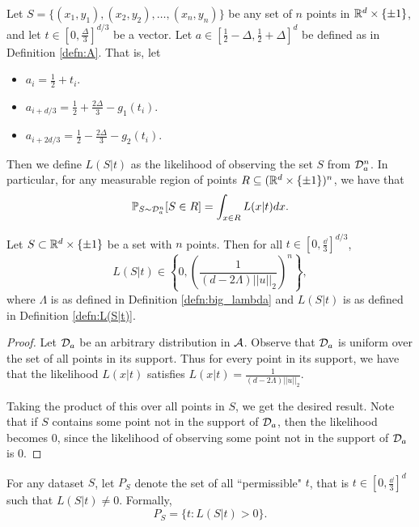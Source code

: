 \begin{defn}\label{defn:L(S|t)}
Let $S = \{(x_1, y_1), (x_2, y_2), \dots, (x_n, y_n)\}$ be any set of $n$ points in $\mathbb R^d \times \{\pm 1\}$, and let $t \in [0, \frac{\Delta}{3}]^{d/3}$ be a vector. Let $a \in [\frac{1}{2} - \Delta, \frac{1}{2} + \Delta]^d$ be defined as in Definition \ref{defn:A}. That is, let 
\begin{itemize}
	\item $a_i = \frac{1}{2} + t_i$.
	\item $a_{i + d/3} = \frac{1}{2} + \frac{2\Delta}{3} - g_1(t_i)$.
	\item $a_{i + 2d/3} = \frac{1}{2} - \frac{2\Delta}{3} - g_2(t_i)$. 
\end{itemize}
Then we define $L(S|t)$ as the likelihood of observing the set $S$ from ${\mathcal D}_a^n$. In particular, for any measurable region of points $R \subseteq (\mathbb R^d \times \{\pm 1\})^n$, we have that $$\mathbb{P}_{S \sim {\mathcal D}_a^n}[S \in R] = \int_{x \in R}L(x|t)dx.$$
\end{defn}

\begin{lem}\label{lem:binary}
Let $S \subset \mathbb R^d \times \{\pm 1\}$ be a set with $n$ points. Then for all $t \in [0, \frac{\dd}{3}]^{d/3}$, $$L(S|t) \in \left\{0, \left(\frac{1}{(d - 2\Lambda)||u||_2}\right)^n\right\},$$ where $\Lambda$ is as defined in Definition \ref{defn:big_lambda} and $L(S|t)$ is as defined in Definition \ref{defn:L(S|t)}. 
\end{lem}

\begin{proof}
Let ${\mathcal D}_a$ be an arbitrary distribution in $\mathcal{A}$. Observe that ${\mathcal D}_a$ is uniform over the set of all points in its support. Thus for every point in its support, we have that the likelihood $L(x|t)$ satisfies $L(x|t) = \frac{1}{(d - 2\Lambda)||u||_2}$. 

Taking the product of this over all points in $S$, we get the desired result. Note that if $S$ contains some point not in the support of ${\mathcal D}_a$, then the likelihood becomes $0$, since the likelihood of observing some point not in the support of ${\mathcal D}_a$ is $0$.
\end{proof}


\begin{defn}\label{defn:permissible_set}
For any dataset $S$, let $P_S$ denote the set of all ``permissible" $t$, that is $t \in [0, \frac{\dd}{3}]^d$ such that $L(S|t) \neq 0$. Formally, $$P_S = \{t: L(S|t) >0\}.$$
\end{defn}

